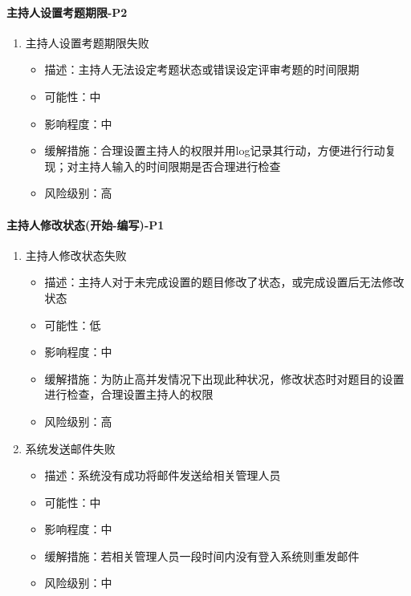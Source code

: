 \documentclass[hyperref, a4paper]{ctexart}
\providecommand{\tightlist}{%
  \setlength{\itemsep}{0pt}\setlength{\parskip}{0pt}}
\let\oldparagraph\paragraph
\renewcommand{\paragraph}[1]{\oldparagraph{#1}\mbox{}}
\begin{document}
\hypertarget{ux4e3bux6301ux4ebaux8bbeux7f6eux8003ux9898ux671fux9650-p2}{%
\paragraph{主持人设置考题期限-P2}\label{ux4e3bux6301ux4ebaux8bbeux7f6eux8003ux9898ux671fux9650-p2}}

\begin{enumerate}
\def\labelenumi{\arabic{enumi}.}
\tightlist
\item
  主持人设置考题期限失败

  \begin{itemize}
  \tightlist
  \item
    描述：主持人无法设定考题状态或错误设定评审考题的时间限期
  \item
    可能性：中
  \item
    影响程度：中
  \item
    缓解措施：合理设置主持人的权限并用log记录其行动，方便进行行动复现；对主持人输入的时间限期是否合理进行检查
  \item
    风险级别：高
  \end{itemize}
\end{enumerate}

\hypertarget{ux4e3bux6301ux4ebaux4feeux6539ux72b6ux6001ux5f00ux59cb-ux7f16ux5199-p1}{%
\paragraph{主持人修改状态(开始-编写)-P1}\label{ux4e3bux6301ux4ebaux4feeux6539ux72b6ux6001ux5f00ux59cb-ux7f16ux5199-p1}}

\begin{enumerate}
\def\labelenumi{\arabic{enumi}.}
\tightlist
\item
  主持人修改状态失败

  \begin{itemize}
  \tightlist
  \item
    描述：主持人对于未完成设置的题目修改了状态，或完成设置后无法修改状态
  \item
    可能性：低
  \item
    影响程度：中
  \item
    缓解措施：为防止高并发情况下出现此种状况，修改状态时对题目的设置进行检查，合理设置主持人的权限
  \item
    风险级别：高
  \end{itemize}
\item
  系统发送邮件失败

  \begin{itemize}
  \tightlist
  \item
    描述：系统没有成功将邮件发送给相关管理人员
  \item
    可能性：中
  \item
    影响程度：中
  \item
    缓解措施：若相关管理人员一段时间内没有登入系统则重发邮件
  \item
    风险级别：中
  \end{itemize}
\end{enumerate}
\end{document}
